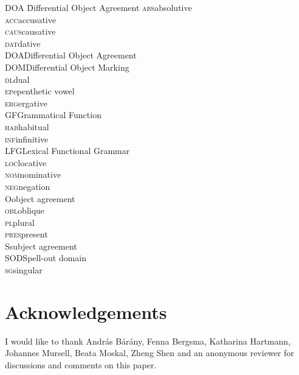 \documentclass[output=paper
,modfonts
,nonflat]{langsci/langscibook}
\begin{document}
\begin{multicols}{2}
	\begin{tabbing}
		\textsc{DOA}\hspace{5mm} \= Differential Object Agreement\kill
		\textsc{abs}\>absolutive\\
		\textsc{acc}\>accusative\\ 
		\textsc{caus}\>causative\\
		\textsc{dat}\>dative\\
		\textsc{DOA}\>Differential Object Agreement\\
		\textsc{DOM}\>Differential Object Marking\\
		\textsc{dl}\>dual\\
		\textsc{ep}\>epenthetic vowel\\
		\textsc{erg}\>ergative\\
		\textsc{GF}\>Grammatical Function\\
		\textsc{hab}\>habitual\\
		\textsc{inf}\>infinitive\\
		\textsc{LFG}\>Lexical Functional Grammar\\
		\textsc{loc}\>locative\\
		\textsc{nom}\>nominative\\
		\textsc{neg}\>negation\\
		O\>object agreement\\
		\textsc{obl}\>oblique\\
		\textsc{pl}\>plural\\
		\textsc{pres}\>present\\
		S\>subject agreement\\
		SOD\>Spell-out domain\\
		\textsc{sg}\>singular\\
	\end{tabbing} 
\end{multicols}

\section*{Acknowledgements}

I would like to thank András Bárány, Fenna Bergsma, Katharina Hartmann, Johannes Mursell, Beata Moskal, Zheng Shen and an anonymous reviewer for discussions and comments on this paper.


{\sloppy
\printbibliography[heading=subbibliography,notkeyword=this]
}
\end{document}
